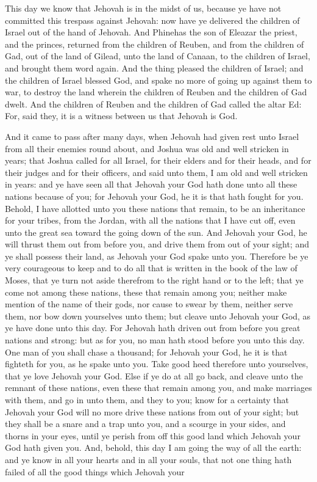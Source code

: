 This day we know that Jehovah is in the midst of us, because ye have not committed this trespass against Jehovah: now have ye delivered the children of Israel out of the hand of Jehovah. And Phinehas the son of Eleazar the priest, and the princes, returned from the children of Reuben, and from the children of Gad, out of the land of Gilead, unto the land of Canaan, to the children of Israel, and brought them word again. And the thing pleased the children of Israel; and the children of Israel blessed God, and spake no more of going up against them to war, to destroy the land wherein the children of Reuben and the children of Gad dwelt. And the children of Reuben and the children of Gad called the altar Ed: For, said they, it is a witness between us that Jehovah is God. 

And it came to pass after many days, when Jehovah had given rest unto Israel from all their enemies round about, and Joshua was old and well stricken in years; that Joshua called for all Israel, for their elders and for their heads, and for their judges and for their officers, and said unto them, I am old and well stricken in years: and ye have seen all that Jehovah your God hath done unto all these nations because of you; for Jehovah your God, he it is that hath fought for you. Behold, I have allotted unto you these nations that remain, to be an inheritance for your tribes, from the Jordan, with all the nations that I have cut off, even unto the great sea toward the going down of the sun. And Jehovah your God, he will thrust them out from before you, and drive them from out of your sight; and ye shall possess their land, as Jehovah your God spake unto you. Therefore be ye very courageous to keep and to do all that is written in the book of the law of Moses, that ye turn not aside therefrom to the right hand or to the left; that ye come not among these nations, these that remain among you; neither make mention of the name of their gods, nor cause to swear by them, neither serve them, nor bow down yourselves unto them; but cleave unto Jehovah your God, as ye have done unto this day. For Jehovah hath driven out from before you great nations and strong: but as for you, no man hath stood before you unto this day. One man of you shall chase a thousand; for Jehovah your God, he it is that fighteth for you, as he spake unto you. Take good heed therefore unto yourselves, that ye love Jehovah your God. Else if ye do at all go back, and cleave unto the remnant of these nations, even these that remain among you, and make marriages with them, and go in unto them, and they to you; know for a certainty that Jehovah your God will no more drive these nations from out of your sight; but they shall be a snare and a trap unto you, and a scourge in your sides, and thorns in your eyes, until ye perish from off this good land which Jehovah your God hath given you.  And, behold, this day I am going the way of all the earth: and ye know in all your hearts and in all your souls, that not one thing hath failed of all the good things which Jehovah your 